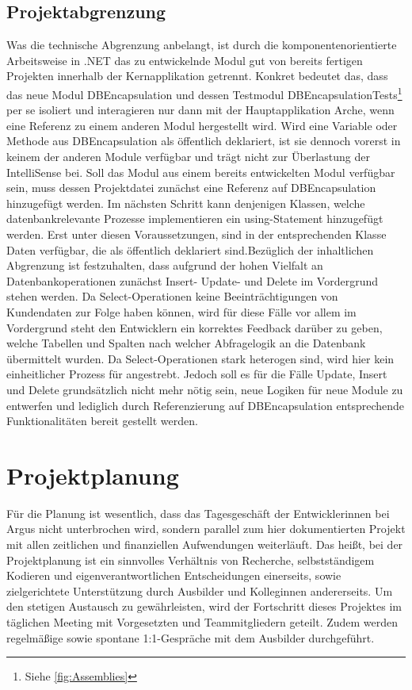 \documentclass[11pt,toc=sectionentrywithoutdots, 
headheight=44pt, headings=optiontoheadandtoc, hyperfootnotes=false, hypertexnames=false]{scrartcl}
\newcommand\extendedref[1]{Siehe \ref{#1}}
\begin{document}
\subsection{Projektabgrenzung}
Was die technische Abgrenzung anbelangt, ist durch die komponentenorientierte Arbeitsweise in .NET das zu entwickelnde Modul gut von bereits fertigen Projekten innerhalb der Kernapplikation getrennt. Konkret bedeutet das, dass das neue Modul \glqq DBEncapsulation\grqq{} und dessen Testmodul \glqq DBEncapsulationTests\grqq{}\footnote{\extendedref{fig:Assemblies}} per se isoliert und interagieren nur dann mit der Hauptapplikation Arche, wenn eine Referenz zu einem anderen Modul hergestellt wird. Wird eine Variable oder Methode aus DBEncapsulation als öffentlich deklariert, ist sie dennoch vorerst in keinem der anderen Module verfügbar und trägt nicht zur Überlastung der \gls{IntelliSense} bei. Soll das Modul aus einem bereits entwickelten Modul verfügbar sein, muss dessen Projektdatei zunächst eine Referenz auf DBEncapsulation hinzugefügt werden. Im nächsten Schritt kann denjenigen Klassen, welche datenbankrelevante Prozesse implementieren ein \glqq using\grqq{}-Statement hinzugefügt werden. Erst unter diesen Voraussetzungen, sind in der entsprechenden Klasse Daten verfügbar, die als öffentlich deklariert sind.\newline\newline Bezüglich der inhaltlichen Abgrenzung ist festzuhalten, dass aufgrund der hohen Vielfalt an Datenbankoperationen zunächst Insert- Update- und Delete im Vordergrund stehen werden. Da Select-Operationen keine Beeinträchtigungen von Kundendaten zur Folge haben können, wird für diese Fälle vor allem im Vordergrund steht den Entwicklern ein korrektes Feedback darüber zu geben, welche Tabellen und Spalten nach welcher Abfragelogik an die Datenbank übermittelt wurden. Da Select-Operationen stark heterogen sind, wird hier kein einheitlicher Prozess für angestrebt. Jedoch soll es für die Fälle Update, Insert und Delete grundsätzlich nicht mehr nötig sein, neue Logiken für neue Module zu entwerfen und lediglich durch Referenzierung auf DBEncapsulation entsprechende Funktionalitäten bereit gestellt werden.

\section{Projektplanung}
Für die Planung ist wesentlich, dass das Tagesgeschäft der Entwicklerinnen bei Argus nicht unterbrochen wird, sondern parallel zum hier dokumentierten Projekt mit allen zeitlichen und finanziellen Aufwendungen weiterläuft. Das heißt, bei der Projektplanung ist ein sinnvolles Verhältnis von Recherche, selbstständigem Kodieren und eigenverantwortlichen Entscheidungen einerseits, sowie zielgerichtete Unterstützung durch Ausbilder und Kolleginnen andererseits. Um den stetigen Austausch zu gewährleisten, wird der Fortschritt dieses Projektes im täglichen Meeting mit Vorgesetzten und Teammitgliedern geteilt. Zudem werden regelmäßige sowie spontane 1:1-Gespräche mit dem Ausbilder durchgeführt.
\end{document}
